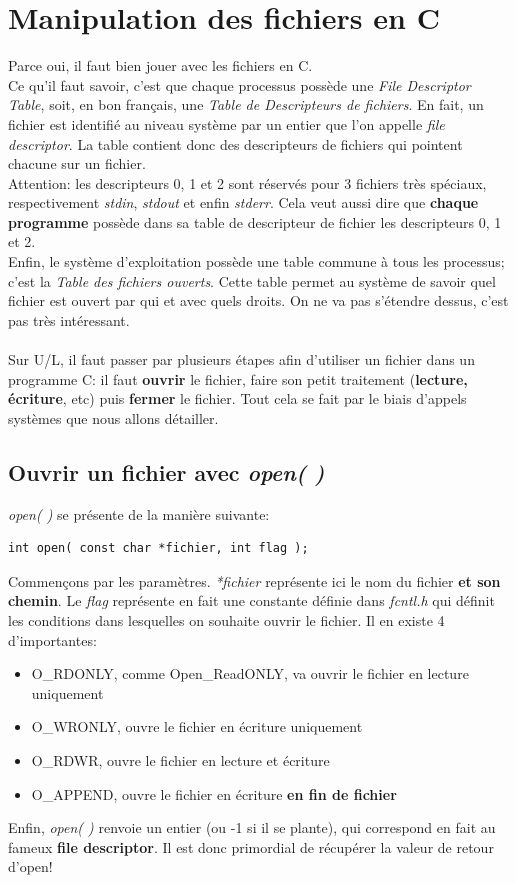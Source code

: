 \documentclass{report}
\begin{document}
\section{Manipulation des fichiers en C}
Parce oui, il faut bien jouer avec les fichiers en C.\\
Ce qu'il faut savoir, c'est que chaque processus possède une \emph{File Descriptor Table}, soit, en bon français, une \emph{Table de Descripteurs de fichiers}. En fait, un fichier est identifié au niveau système par un entier que l'on appelle \emph{file descriptor}. La table contient donc des descripteurs de fichiers qui pointent chacune sur un fichier.\\
Attention: les descripteurs 0, 1 et 2 sont réservés pour 3 fichiers très spéciaux, respectivement \emph{stdin}, \emph{stdout} et enfin \emph{stderr}. Cela veut aussi dire que \textbf{chaque programme} possède dans sa table de descripteur de fichier les descripteurs 0, 1 et 2.\\
Enfin, le système d'exploitation possède une table commune à tous les processus; c'est la \emph{Table des fichiers ouverts}. Cette table permet au système de savoir quel fichier est ouvert par qui et avec quels droits. On ne va pas s'étendre dessus, c'est pas très intéressant.
\paragraph{}
Sur U/L, il faut passer par plusieurs étapes afin d'utiliser un fichier dans un programme C: il faut \textbf{ouvrir} le fichier, faire son petit traitement (\textbf{lecture, écriture}, etc) puis \textbf{fermer} le fichier. Tout cela se fait par le biais d'appels systèmes que nous allons détailler.

\subsection{Ouvrir un fichier avec \emph{open( )}}
\emph{open( )} se présente de la manière suivante:
\begin{verbatim}
int open( const char *fichier, int flag );
\end{verbatim}
Commençons par les paramètres. \emph{*fichier} représente ici le nom du fichier \textbf{et son chemin}. Le \emph{flag} représente en fait une constante définie dans \emph{fcntl.h} qui définit les conditions dans lesquelles on souhaite ouvrir le fichier. Il en existe 4 d'importantes:
\begin{itemize}
\item{O\_RDONLY, comme Open\_ReadONLY, va ouvrir le fichier en lecture uniquement}
\item{O\_WRONLY, ouvre le fichier en écriture uniquement}
\item{O\_RDWR, ouvre le fichier en lecture et écriture}
\item{O\_APPEND, ouvre le fichier en écriture \textbf{en fin de fichier}}
\end{itemize}
Enfin, \emph{open( )} renvoie un entier (ou -1 si il se plante), qui correspond en fait au fameux \textbf{file descriptor}. Il est donc primordial de récupérer la valeur de retour d'open!
\end{document}
